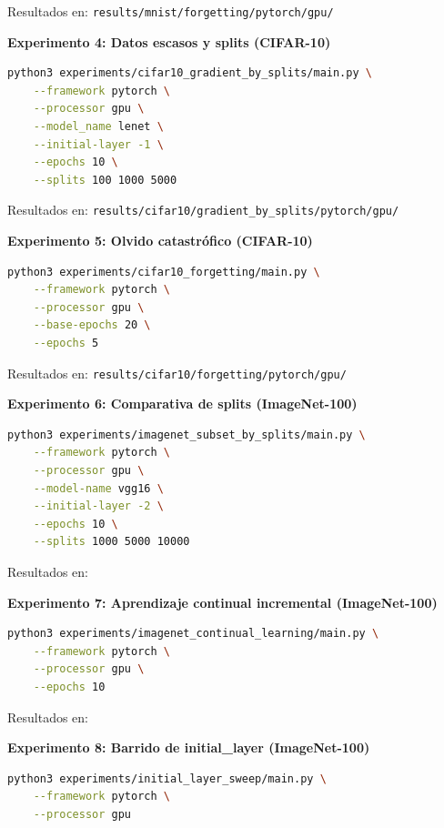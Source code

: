 Resultados en: \texttt{results/mnist/forgetting/pytorch/gpu/}

\textbf{Experimento 4: Datos escasos y splits (CIFAR-10)}

\begin{lstlisting}[language=bash]
python3 experiments/cifar10_gradient_by_splits/main.py \
    --framework pytorch \
    --processor gpu \
    --model_name lenet \
    --initial-layer -1 \
    --epochs 10 \
    --splits 100 1000 5000
\end{lstlisting}

Resultados en: \texttt{results/cifar10/gradient\_by\_splits/pytorch/gpu/}

\textbf{Experimento 5: Olvido catastrófico (CIFAR-10)}

\begin{lstlisting}[language=bash]
python3 experiments/cifar10_forgetting/main.py \
    --framework pytorch \
    --processor gpu \
    --base-epochs 20 \
    --epochs 5
\end{lstlisting}

Resultados en: \texttt{results/cifar10/forgetting/pytorch/gpu/}

\textbf{Experimento 6: Comparativa de splits (ImageNet-100)}

\begin{lstlisting}[language=bash]
python3 experiments/imagenet_subset_by_splits/main.py \
    --framework pytorch \
    --processor gpu \
    --model-name vgg16 \
    --initial-layer -2 \
    --epochs 10 \
    --splits 1000 5000 10000
\end{lstlisting}

Resultados en: 

\textbf{Experimento 7: Aprendizaje continual incremental (ImageNet-100)}

\begin{lstlisting}[language=bash]
python3 experiments/imagenet_continual_learning/main.py \
    --framework pytorch \
    --processor gpu \
    --epochs 10
\end{lstlisting}

Resultados en: 

\textbf{Experimento 8: Barrido de initial\_layer (ImageNet-100)}

\begin{lstlisting}[language=bash]
python3 experiments/initial_layer_sweep/main.py \
    --framework pytorch \
    --processor gpu
\end{lstlisting}

